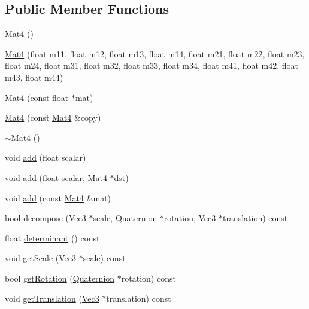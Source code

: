 \subsection*{Public Member Functions}
\begin{DoxyCompactItemize}
\item 
\hyperlink{classMat4_ab26a891e96114b174d518adaf9059db5}{Mat4} ()
\item 
\hyperlink{classMat4_a9ff0ba7e863527c97206e38a12b9738c}{Mat4} (float m11, float m12, float m13, float m14, float m21, float m22, float m23, float m24, float m31, float m32, float m33, float m34, float m41, float m42, float m43, float m44)
\item 
\hyperlink{classMat4_ae32b0c3f7fc370336cedb7bbee98a32a}{Mat4} (const float $\ast$mat)
\item 
\hyperlink{classMat4_a67ddcbb4713bb335042aef3b14324456}{Mat4} (const \hyperlink{classMat4}{Mat4} \&copy)
\item 
\hyperlink{classMat4_a72fac55214c733b56248d2b321aaf69b}{$\sim$\+Mat4} ()
\item 
void \hyperlink{classMat4_aa33c5fad52aba88880b36d95c6ae85ae}{add} (float scalar)
\item 
void \hyperlink{classMat4_a686767982006e42351c87a027af12c17}{add} (float scalar, \hyperlink{classMat4}{Mat4} $\ast$dst)
\item 
void \hyperlink{classMat4_a4eaf193ce281e0ea8db5cdffcf66bda3}{add} (const \hyperlink{classMat4}{Mat4} \&mat)
\item 
bool \hyperlink{classMat4_a35e55973b2473838bd637d1de1ca220e}{decompose} (\hyperlink{classVec3}{Vec3} $\ast$\hyperlink{classMat4_a37c910140d6378e4ef7c7bb1e2d0296d}{scale}, \hyperlink{classQuaternion}{Quaternion} $\ast$rotation, \hyperlink{classVec3}{Vec3} $\ast$translation) const
\item 
float \hyperlink{classMat4_aba33e196546ec0ed036c7fe690c072ac}{determinant} () const
\item 
void \hyperlink{classMat4_a6e71ae3f0286e5ea417f237aa0cdefeb}{get\+Scale} (\hyperlink{classVec3}{Vec3} $\ast$\hyperlink{classMat4_a37c910140d6378e4ef7c7bb1e2d0296d}{scale}) const
\item 
bool \hyperlink{classMat4_a585ebfce44ed9fd746a81bfed1e3cccf}{get\+Rotation} (\hyperlink{classQuaternion}{Quaternion} $\ast$rotation) const
\item 
void \hyperlink{classMat4_a92b33d42c6766de2183ebd53269fb96c}{get\+Translation} (\hyperlink{classVec3}{Vec3} $\ast$translation) const
\item 

\end{DoxyCompactItemize}
